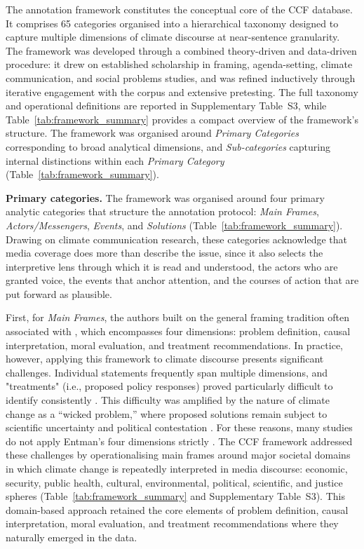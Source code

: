 \documentclass[12pt]{article}
\renewcommand\_{\texttt{\detokenize{_}\allowbreak}}
\begin{document}
The annotation framework constitutes the conceptual core of the CCF database. It comprises 65 categories organised into a hierarchical taxonomy designed to capture multiple dimensions of climate discourse at near-sentence granularity. The framework was developed through a combined theory-driven and data-driven procedure: it drew on established scholarship in framing, agenda-setting, climate communication, and social problems studies, and was refined inductively through iterative engagement with the corpus and extensive pretesting. The full taxonomy and operational definitions are reported in Supplementary Table~S3, while Table~\ref{tab:framework_summary} provides a compact overview of the framework's structure. The framework was organised around \emph{Primary Categories} corresponding to broad analytical dimensions, and \emph{Sub-categories} capturing internal distinctions within each \emph{Primary Category} (Table~\ref{tab:framework_summary}).

{\bfseries{Primary categories.}} The framework was organised around four primary analytic categories that structure the annotation protocol: \emph{Main Frames}, \emph{Actors/Messengers}, \emph{Events}, and \emph{Solutions} (Table~\ref{tab:framework_summary}). Drawing on climate communication research, these categories acknowledge that media coverage does more than describe the issue, since it also selects the interpretive lens through which it is read and understood, the actors who are granted voice, the events that anchor attention, and the courses of action that are put forward as plausible.

First, for \emph{Main Frames}, the authors built on the general framing tradition often associated with \textcite{entman_framing_1993}, which encompasses four dimensions: problem definition, causal interpretation, moral evaluation, and treatment recommendations. In practice, however, applying this framework to climate discourse presents significant challenges. Individual statements frequently span multiple dimensions, and "treatments" (i.e., proposed policy responses) proved particularly difficult to identify consistently \autocite{grundmann_using_2022}. This difficulty was amplified by the nature of climate change as a ``wicked problem,'' where proposed solutions remain subject to scientific uncertainty and political contestation \autocite{grundmann_climate_2016}. For these reasons, many studies do not apply Entman's four dimensions strictly \autocite{stede_climate_2021}. The CCF framework addressed these challenges by operationalising main frames around major societal domains in which climate change is repeatedly interpreted in media discourse: economic, security, public health, cultural, environmental, political, scientific, and justice spheres (Table~\ref{tab:framework_summary} and Supplementary Table~S3). This domain-based approach retained the core elements of problem definition, causal interpretation, moral evaluation, and treatment recommendations where they naturally emerged in the data.
\end{document}
